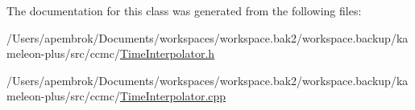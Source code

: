 The documentation for this class was generated from the following files\-:\begin{DoxyCompactItemize}
\item 
/\-Users/apembrok/\-Documents/workspaces/workspace.\-bak2/workspace.\-backup/kameleon-\/plus/src/ccmc/\hyperlink{_time_interpolator_8h}{Time\-Interpolator.\-h}\item 
/\-Users/apembrok/\-Documents/workspaces/workspace.\-bak2/workspace.\-backup/kameleon-\/plus/src/ccmc/\hyperlink{_time_interpolator_8cpp}{Time\-Interpolator.\-cpp}\end{DoxyCompactItemize}

